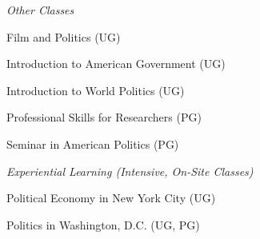 \documentclass[12pt]{article}
\newcommand{\halfblankline}{\quad\vspace{-0.5\baselineskip}\pagebreak[3]}
\begin{document}
\emph{Other Classes}
    \begin{innerlist}
        \item[] Film and Politics (UG)
    	        	\begin{innerlist}
        		    	\item[] [SU12, AU13]
        		    \end{innerlist}
        \item[] Introduction to American Government (UG)
    	        	\begin{innerlist}
        		    	\item[] [AU08, SP09, SU09, AU09, SP10, AU11, SP12, AU12, SP13, SP14]
        		    \end{innerlist}
        \item[] Introduction to World Politics (UG)
    	        	\begin{innerlist}
        		    	\item[] [SU04, SU05, AU05, SP06, SU06]
        		    \end{innerlist}
        \item[] Professional Skills for Researchers (PG)
        		    \begin{innerlist}
        		    	\item[] [AY16-17, AY17-18]
        		    \end{innerlist}
        \item[] Seminar in American Politics (PG)
    	        	\begin{innerlist}
        		    	\item[] [AU08]
        		    \end{innerlist}
    \end{innerlist}
    
\halfblankline

\emph{Experiential Learning (Intensive, On-Site Classes)}
    \begin{innerlist}
        \item[] Political Economy in New York City (UG)
    	        	\begin{innerlist}
        		    	\item[] [SU13]
        		    \end{innerlist}
        \item[] Politics in Washington, D.C. (UG, PG)
    	        	\begin{innerlist}
        		    	\item[] [SU09, SU11, SU14]
        		    \end{innerlist}
    \end{innerlist}
\end{document}
